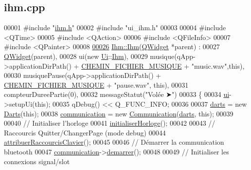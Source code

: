 \hypertarget{ihm_8cpp_source}{}\subsection{ihm.\+cpp}

\begin{DoxyCode}
00001 \textcolor{preprocessor}{#include "\hyperlink{ihm_8h}{ihm.h}"}
00002 \textcolor{preprocessor}{#include "ui\_ihm.h"}
00003 
00004 \textcolor{preprocessor}{#include <QTime>}
00005 \textcolor{preprocessor}{#include <QAction>}
00006 \textcolor{preprocessor}{#include <QFileInfo>}
00007 \textcolor{preprocessor}{#include <QPainter>}
00008 
\hyperlink{class_ihm_a50a7a15775452923868348bdbe4fa51e}{00026} \hyperlink{class_ihm_a50a7a15775452923868348bdbe4fa51e}{Ihm::Ihm}(\hyperlink{class_q_widget}{QWidget} *parent) :
00027     \hyperlink{class_q_widget}{QWidget}(parent),
00028     ui(new \hyperlink{namespace_ui}{Ui}::\hyperlink{class_ihm}{Ihm}),
00029     musique(qApp->applicationDirPath() + \hyperlink{ihm_8h_aaf7f17312e64cf24f4c93fc657e5594f}{CHEMIN\_FICHIER\_MUSIQUE} + \textcolor{stringliteral}{"music.wav"},this),
00030     musiquePause(qApp->applicationDirPath() + \hyperlink{ihm_8h_aaf7f17312e64cf24f4c93fc657e5594f}{CHEMIN\_FICHIER\_MUSIQUE} + \textcolor{stringliteral}{"pause.wav"},
      this),
00031     compteurDureePartie(0),
00032     messageStatut(\textcolor{stringliteral}{"Volée ➤"})
00033 \{
00034     \hyperlink{class_ihm_a0ac5f47856566ceeeca1720109bf70ea}{ui}->setupUi(\textcolor{keyword}{this});
00035     qDebug() << Q\_FUNC\_INFO;
00036 
00037     \hyperlink{class_ihm_a2a0f54d33f4d6b2531ec2190c4a2356e}{darts} = \textcolor{keyword}{new} \hyperlink{class_darts}{Darts}(\textcolor{keyword}{this});
00038     \hyperlink{class_ihm_a2f3d4781795781a840786cd8c2233899}{communication} = \textcolor{keyword}{new} \hyperlink{class_communication}{Communication}(\hyperlink{class_ihm_a2a0f54d33f4d6b2531ec2190c4a2356e}{darts}, \textcolor{keyword}{this});
00039 
00040     \textcolor{comment}{// Initialiser l'horloge}
00041     \hyperlink{class_ihm_aa5a3e97de39e919ea8807d30167da510}{initialiserHorloge}();
00042 
00043     \textcolor{comment}{// Raccourcis Quitter/ChangerPage (mode debug)}
00044     \hyperlink{class_ihm_a2b7dbb2d087d4ca15cee9707a1796b62}{attribuerRaccourcisClavier}();
00045 
00046     \textcolor{comment}{// Démarrer la communication bluetooth}
00047     \hyperlink{class_ihm_a2f3d4781795781a840786cd8c2233899}{communication}->\hyperlink{class_communication_af29ea9a1c2ce29436f2331c322f6ebbf}{demarrer}();
00048 
00049     \textcolor{comment}{// Initialiser les connexions signal/slot}

\end{DoxyCode}
